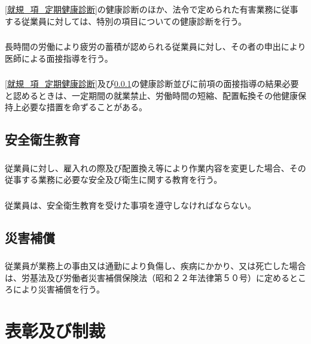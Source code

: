 \documentclass{jsarticle}
\begin{document}
\subsubsection{}
\label{就規_項_特別健康診断}
\ref{就規_項_定期健康診断}の健康診断のほか、法令で定められた有害業務に従事する従業員に対しては、特別の項目についての健康診断を行う。
\subsubsection{}
\label{就規_項_医師の面接指導}
長時間の労働により疲労の蓄積が認められる従業員に対し、その者の申出により医師による面接指導を行う。
\subsubsection{}
\label{就規_項_健康保持上必要な措置}
\ref{就規_項_定期健康診断}及び\ref{就規_項_特別健康診断}の健康診断並びに前項の面接指導の結果必要と認めるときは、一定期間の就業禁止、労働時間の短縮、配置転換その他健康保持上必要な措置を命ずることがある。

\subsection{安全衛生教育}
\label{就規_条_安全衛生教育}
\subsubsection{}
\label{就規_項_安全衛生教育}
従業員に対し、雇入れの際及び配置換え等により作業内容を変更した場合、その従事する業務に必要な安全及び衛生に関する教育を行う。
\subsubsection{}
\label{就規_項_安全衛生教育指導事項の遵守}
従業員は、安全衛生教育を受けた事項を遵守しなければならない。

\subsection{災害補償}
\label{就規_条_災害補償}
\subsubsection{}
\label{就規_項_災害補償}
従業員が業務上の事由又は通勤により負傷し、疾病にかかり、又は死亡した場合は、労基法及び労働者災害補償保険法（昭和２２年法律第５０号）に定めるところにより災害補償を行う。

\section{表彰及び制裁}
\label{就規_章_表彰及び制裁}
\end{document}

